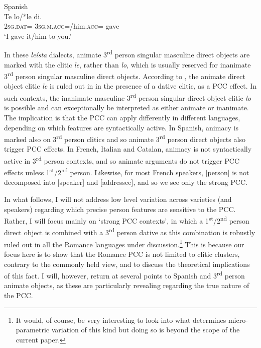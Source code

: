 \documentclass[output=paper,colorlinks,citecolor=brown,nonflat]{./langscibook}
\begin{document}
\ea%
    \label{ex:sheehan:8}
    Spanish \citep[321]{OrmazabalRomero2007}\\
    \gll    Te     lo/*le     di.  \\
            \textsc{2sg}.\textsc{dat}=  \textsc{3sg.m.acc}=/him.\textsc{acc}=  gave\\
    \glt    ‘I gave it/him to you.’
\z

In these \textit{leísta} dialects, animate 3\textsuperscript{rd} person singular masculine direct objects are marked with the clitic \textit{le}, rather than \textit{lo}, which is usually reserved for inanimate 3\textsuperscript{rd} person singular masculine direct objects. According to \citeauthor{OrmazabalRomero2007}, the animate direct object clitic \textit{le} is ruled out in  in the presence of a dative clitic, as a PCC effect. In such contexts, the inanimate masculine 3\textsuperscript{rd} person singular direct object clitic \textit{lo} is possible and can exceptionally be interpreted as either animate or inanimate. The implication is that the PCC can apply differently in different languages, depending on which features are syntactically active. In Spanish, animacy is marked also on 3\textsuperscript{rd} person clitics and so animate 3\textsuperscript{rd} person direct objects also trigger PCC effects. In French, Italian and Catalan, animacy is not syntactically active in 3\textsuperscript{rd} person contexts, and so animate arguments do not trigger PCC effects unless 1\textsuperscript{st}/2\textsuperscript{nd} person. Likewise, for most French speakers, [person] is not decomposed into [speaker] and [addressee], and so we see only the strong PCC.

In what follows, I will not address low level variation across varieties (and speakers) regarding which precise person features are sensitive to the PCC. Rather, I will focus mainly on ‘strong PCC contexts’, in which a 1\textsuperscript{st}/2\textsuperscript{nd} person direct object is combined with a 3\textsuperscript{rd} person dative as this combination is robustly ruled out in all the Romance languages under discussion.\footnote{It would, of course, be very interesting to look into what determines micro-parametric variation of this kind but doing so is beyond the scope of the current paper.}  This is because our focus here is to show that the Romance PCC is not limited to clitic clusters, contrary to the commonly held view, and to discuss the theoretical implications of this fact. I will, however, return at several points to Spanish and 3\textsuperscript{rd} person animate objects, as these are particularly revealing regarding the true nature of the PCC. 
\end{document}
